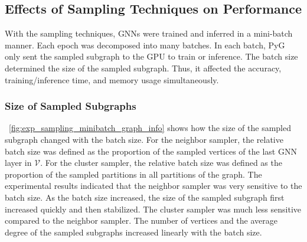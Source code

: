 \subsection{Effects of Sampling Techniques on Performance}
\label{sec:effects_of_sampling_techniques_on_performance}

With the sampling techniques, GNNs were trained and inferred in a mini-batch manner.
%
Each epoch was decomposed into many batches.
%
In each batch, PyG only sent the sampled subgraph to the GPU to train or inference.
%
The batch size determined the size of the sampled subgraph.
%
Thus, it affected the accuracy, training/inference time, and memory usage simultaneously.

\subsubsection{Size of Sampled Subgraphs}

\figurename~\ref{fig:exp_sampling_minibatch_graph_info} shows how the size of the sampled subgraph changed with the batch size.
%
For the neighbor sampler, the relative batch size was defined as the proportion of the sampled vertices of the last GNN layer in $\mathcal{V}$.
%
For the cluster sampler, the relative batch size was defined as the proportion of the sampled partitions in all partitions of the graph.
%
The experimental results indicated that the neighbor sampler was very sensitive to the batch size.
%
As the batch size increased, the size of the sampled subgraph first increased quickly and then stabilized.
%
The cluster sampler was much less sensitive compared to the neighbor sampler.
%
The number of vertices and the average degree of the sampled subgraphs increased linearly with the batch size.

